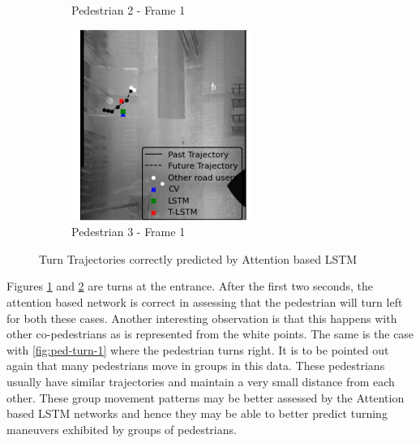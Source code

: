 \documentclass{article}
\begin{document}
\begin{figure}[H]
\begin{subfigure}{0.3\textwidth}
  \caption{Pedestrian 2 - Frame 1}
  \label{fig:ped-turn-2}
\end{subfigure}
\begin{subfigure}{0.3\textwidth}
  \centering
  \includegraphics[width=\linewidth]{quali_results/ped-turn-3.png}
  \caption{Pedestrian 3 - Frame 1}
  \label{fig:ped-turn-3}
\end{subfigure}
\caption{Turn Trajectories correctly predicted by Attention based LSTM}
\label{fig:ped1&2&3}
\end{figure}

Figures \ref{fig:ped-turn-2} and \ref{fig:ped-turn-3} are turns at the entrance. After the first two seconds, the attention based network is correct in assessing that the pedestrian will turn left for both these cases. Another interesting observation is that this happens with other co-pedestrians as is represented from the white points. The same is the case with \ref{fig:ped-turn-1} where the pedestrian turns right. It is to be pointed out again that many pedestrians move in groups in this data. These pedestrians usually have similar trajectories and maintain a very small distance from each other. These group movement patterns may be better assessed by the Attention based LSTM networks and hence they may be able to better predict turning maneuvers exhibited by groups of pedestrians. 
\end{document}
